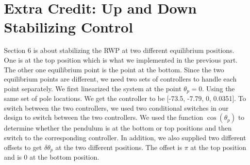 




\section{Extra Credit: Up and Down Stabilizing Control}
Section 6 is about stabilizing the RWP at two different equilibrium positions. One is at the top position which is what we implemented in the previous part. The other one equilibrium point is the point at the bottom. 
Since the two equilibrium points are different, we need two sets of controllers to handle each point separately. We first linearized the system at the point $\theta_p=0$. Using the same set of pole locations. We get the controller to be [-73.5, -7.79, 0, 0.0351]. 
To switch between the two controllers, we used two conditional switches in our design to switch between the two controllers. We used the function $\cos(⁡\theta_p)$ to determine whether the pendulum is at the bottom or top positions and then switch to the corresponding controller. In addition, we also supplied two different offsets to get $\delta\theta_p$ at the two different positions. The offset is $\pi$ at the top position and is 0 at the bottom position.

